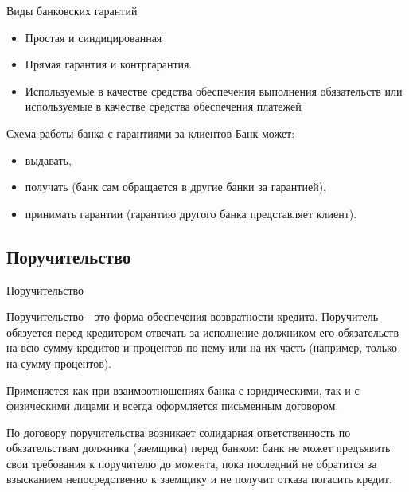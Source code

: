 \documentclass[_Banking_p3.tex]{subfiles}
\begin{document}
\begin{frame}{Виды банковских гарантий}
\begin{itemize}[<+->]
\item
Простая и синдицированная
\item
Прямая гарантия и контргарантия.
\item
Используемые в качестве средства обеспечения выполнения обязательств или используемые в качестве средства обеспечения платежей
\end{itemize}
\end{frame}

\begin{frame}{Схема работы банка с гарантиями за клиентов}
Банк может:

\begin{itemize}[<+->]
\item
выдавать, 

\item
получать (банк сам обращается в другие банки за гарантией),

\item
принимать гарантии (гарантию другого банка представляет клиент).

\end{itemize}
\end{frame}

\subsection{Поручительство}
\begin{frame} [ allowframebreaks]{Поручительство}
\begin{block}{Поручительство}
\quad
- это форма обеспечения возвратности кредита. Поручитель обязуется перед кредитором отвечать за исполнение должником его обязательств на всю сумму кредитов и процентов по нему или на их часть (например, только на сумму процентов).
\end{block}

\pagebreak
Применяется как при взаимоотношениях банка с юридическими, так и с физическими лицами и всегда оформляется письменным договором.

По договору поручительства возникает солидарная ответственность по обязательствам должника (заемщика) перед банком: банк не может предъявить свои требования к поручителю до момента, пока последний не обратится за взысканием непосредственно к заемщику и не получит отказа погасить кредит. 


\end{frame}
\end{document}
